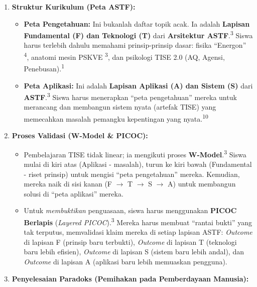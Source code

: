 \documentclass[
  letterpaper,
  DIV=11,
  numbers=noendperiod]{scrreprt}
\begin{document}
\begin{enumerate}
\def\labelenumi{\arabic{enumi}.}
\item
  \textbf{Struktur Kurikulum (Peta ASTF):}

  \begin{itemize}
  \item
    \textbf{Peta Pengetahuan:} Ini bukanlah daftar topik acak. Ia adalah
    \textbf{Lapisan Fundamental (F) dan Teknologi (T)} dari
    \textbf{Arsitektur ASTF}.\textsuperscript{3} Siswa harus terlebih
    dahulu memahami prinsip-prinsip dasar: fisika ``Energon''
    \textsuperscript{4}, anatomi mesin PSKVE \textsuperscript{3}, dan
    psikologi TISE 2.0 (AQ, Agensi, Penebusan).\textsuperscript{1}
  \item
    \textbf{Peta Aplikasi:} Ini adalah \textbf{Lapisan Aplikasi (A) dan
    Sistem (S)} dari \textbf{ASTF}.\textsuperscript{3} Siswa harus
    menerapkan ``peta pengetahuan'' mereka untuk merancang dan membangun
    sistem nyata (artefak TISE) yang memecahkan masalah pemangku
    kepentingan yang nyata.\textsuperscript{10}
  \end{itemize}
\item
  \textbf{Proses Validasi (W-Model \& PICOC):}

  \begin{itemize}
  \item
    Pembelajaran TISE tidak linear; ia mengikuti proses
    \textbf{W-Model}.\textsuperscript{3} Siswa mulai di kiri atas
    (Aplikasi - masalah), turun ke kiri bawah (Fundamental - riset
    prinsip) untuk mengisi ``peta pengetahuan'' mereka. Kemudian, mereka
    naik di sisi kanan (F \(\rightarrow\) T \(\rightarrow\) S
    \(\rightarrow\) A) untuk membangun solusi di ``peta aplikasi''
    mereka.
  \item
    Untuk \emph{membuktikan} penguasaan, siswa harus menggunakan
    \textbf{PICOC Berlapis} (\emph{Layered PICOC}).\textsuperscript{3}
    Mereka harus membuat ``rantai bukti'' yang tak terputus, memvalidasi
    klaim mereka di setiap lapisan ASTF: \emph{Outcome} di lapisan F
    (prinsip baru terbukti), \emph{Outcome} di lapisan T (teknologi baru
    lebih efisien), \emph{Outcome} di lapisan S (sistem baru lebih
    andal), dan \emph{Outcome} di lapisan A (aplikasi baru lebih
    memuaskan pengguna).
  \end{itemize}
\item
  \textbf{Penyelesaian Paradoks (Pemihakan pada Pemberdayaan Manusia):}


\end{enumerate}
\end{document}
